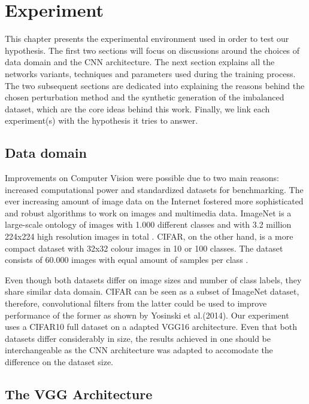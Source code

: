 \chapter{Experiment}

This chapter presents the experimental environment used in order to test our hypothesis. The first two sections will focus on discussions around the choices of data domain and the CNN architecture. The next section explains all the networks variants, techniques and parameters used during the training process. The two subsequent sections are dedicated into explaining the reasons behind the chosen perturbation method and the synthetic generation of the imbalanced dataset, which are the core ideas behind this work. Finally, we link each experiment(s) with the hypothesis it tries to answer. 
\section{Data domain}

Improvements on Computer Vision were possible due to two main reasons: increased computational power and standardized datasets for benchmarking. The ever increasing amount of image data on the Internet fostered more sophisticated and robust algorithms to work on images and multimedia data. ImageNet is a large-scale ontology of images with 1.000 different classes and with 3.2 million 224x224 high resolution images in total \cite{deng2009imagenet}. CIFAR, on the other hand, is a more compact dataset with 32x32 colour images in 10 or 100 classes. The dataset consists of 60.000 images with equal amount of samples per class \cite{krizhevsky_2009}.

Even though both datasets differ on image sizes and number of class labels, they share similar data domain. CIFAR can be seen as a subset of ImageNet dataset, therefore, convolutional filters from the latter could be used to improve performance of the former as shown by Yosinski et al.(2014). Our experiment uses a CIFAR10 full dataset on a adapted VGG16 architecture. Even that both datasets differ considerably in size, the results achieved in one should be interchangeable as the CNN architecture was adapted to accomodate the difference on the dataset size.

\section{The VGG Architecture}

